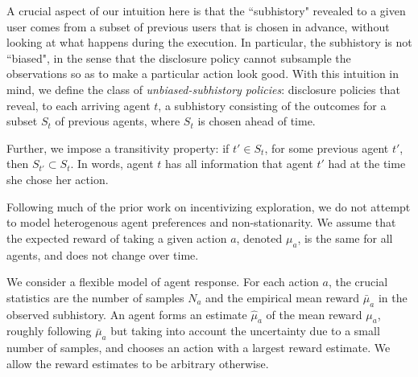 A crucial aspect of our intuition here is that the ``subhistory" revealed to a given user comes from a subset of previous users that is chosen in advance, without looking at what happens during the execution. In particular, the subhistory is not ``biased", in the sense that the disclosure policy cannot subsample the observations so as to make a particular action look good. 
With this intuition in mind, we define the class of \emph{unbiased-subhistory policies}: disclosure policies that reveal, to each arriving agent $t$, a subhistory  consisting of the outcomes for a subset $S_t$ of previous agents, where $S_t$ is chosen ahead of time.

Further, we impose a transitivity property: if $t' \in S_t$, for some previous agent $t'$, then $S_{t'}\subset S_t$. In words, agent $t$ has all information that agent $t'$ had at the time she chose her action. 

Following much of the prior work on incentivizing exploration, we do not attempt to model heterogenous agent preferences and non-stationarity. We assume that the expected reward of taking a given action $a$, denoted $\mu_a$, is the same for all agents, and does not change over time.

We consider a flexible model of agent response. For each action $a$, the crucial statistics are the number of samples $N_a$ and the empirical mean reward $\bar{\mu}_a$ in the observed subhistory. An agent forms an estimate $\hat{\mu}_a$ of the mean reward $\mu_a$, roughly following $\bar{\mu}_a$ but taking into account the uncertainty due to a small number of samples, and chooses an action with a largest reward estimate. We allow the reward estimates to be arbitrary otherwise.

